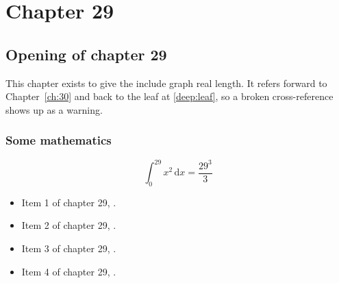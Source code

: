 \chapter{Chapter 29}
\label{ch:29}
\section{Opening of chapter 29}
This chapter exists to give the include graph real length. It refers
forward to Chapter~\ref{ch:30} and back to the leaf
at \ref{deep:leaf}, so a broken cross-reference shows up as a warning.

\subsection{Some mathematics}
\begin{equation}
  \int_0^{29} x^{2} \, \mathrm{d}x = \frac{29^{3}}{3}
\end{equation}

\begin{itemize}
  \item Item 1 of chapter 29, .
  \item Item 2 of chapter 29, .
  \item Item 3 of chapter 29, .
  \item Item 4 of chapter 29, .
\end{itemize}
